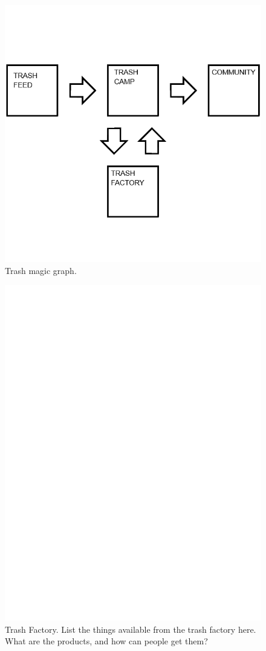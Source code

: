 \documentclass{report}
\begin{document}
\begin{figure}
	\centering
	\includegraphics[width=5in]{imageserver/uploadimages/image15.png}
	\caption{Trash magic graph.}
\end{figure}

\begin{figure}
	\centering
	\includegraphics[width=5in]{imageserver/uploadimages/image3.png}
	\caption{Trash Factory. List the things available from the trash factory here.  What are the products, and how can people get them?}
\end{figure}
\end{document}
